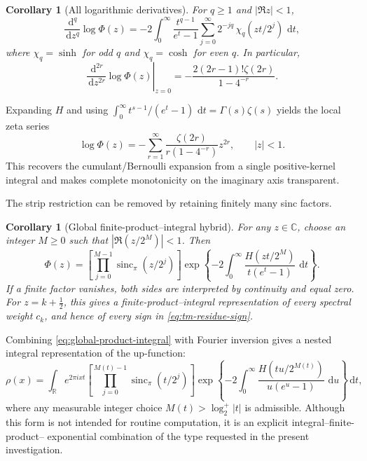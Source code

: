 \documentclass[11pt]{article}
\newtheorem{corollary}[theorem]{Corollary}
\theoremstyle{definition}
\theoremstyle{remark}
\newcommand{\C}{\mathbb C}
\newcommand{\dd}{\,\mathrm d}
\newcommand{\sincpi}{\operatorname{sinc}_{\pi}}
\begin{document}
\begin{corollary}[All logarithmic derivatives]
\label{cor:malmsten-derivatives}
For \(q\ge1\) and \(|\Re z|<1\),
\begin{equation}
 \frac{\dd^q}{\dd z^q}\log\Phi(z)
 =-2\int_0^\infty\frac{t^{q-1}}{e^t-1}
   \sum_{j=0}^{\infty}2^{-jq}\,\chi_q(zt/2^j)\,\dd t,      \label{eq:logPhi-deriv-integral}
\end{equation}
where \(\chi_q=\sinh\) for odd \(q\) and \(\chi_q=\cosh\) for even \(q\).
In particular,
\begin{equation}
 \left.\frac{\dd^{2r}}{\dd z^{2r}}\log\Phi(z)\right|_{z=0}
 =-\frac{2(2r-1)!\zeta(2r)}{1-4^{-r}}.                    \label{eq:logPhi-even-jet}
\end{equation}
\end{corollary}

Expanding \(H\) and using
\(\int_0^\infty t^{s-1}/(e^t-1)\,\dd t=\Gamma(s)\zeta(s)\)
yields the local zeta series
\begin{equation}
 \log\Phi(z)
 =-\sum_{r=1}^{\infty}
   \frac{\zeta(2r)}{r(1-4^{-r})}z^{2r},
 \qquad |z|<1.                                             \label{eq:logPhi-zeta-series}
\end{equation}
This recovers the cumulant/Bernoulli expansion from a single positive-kernel integral and
makes complete monotonicity on the imaginary axis transparent.

The strip restriction can be removed by retaining finitely many sinc factors.

\begin{corollary}[Global finite-product--integral hybrid]
\label{cor:global-hybrid}
For any \(z\in\C\), choose an integer \(M\ge0\) such that
\(|\Re(z/2^M)|<1\).  Then
\begin{equation}
\boxed{
 \Phi(z)=
 \left[\prod_{j=0}^{M-1}\sincpi(z/2^j)\right]
 \exp\!\left\{-2\int_0^\infty
 \frac{H(zt/2^M)}{t(e^t-1)}\,\dd t\right\}.}             \label{eq:global-product-integral}
\end{equation}
If a finite factor vanishes, both sides are interpreted by continuity and equal zero.
For \(z=k+\tfrac12\), this gives a finite-product--integral representation of every
spectral weight \(c_k\), and hence of every sign in \eqref{eq:tm-residue-sign}.
\end{corollary}

Combining \eqref{eq:global-product-integral} with Fourier inversion gives a nested
integral representation of the up-function:
\begin{equation}
 \rho(x)=\int_{\mathbb R}e^{2\pi ixt}
 \left[\prod_{j=0}^{M(t)-1}\sincpi(t/2^j)\right]
 \exp\!\left\{-2\int_0^\infty
 \frac{H(tu/2^{M(t)})}{u(e^u-1)}\,\dd u\right\}\dd t,     \label{eq:rho-nested-malmsten}
\end{equation}
where any measurable integer choice \(M(t)>\log_2^+|t|\) is admissible.  Although this
form is not intended for routine computation, it is an explicit integral--finite-product--
exponential combination of the type requested in the present investigation.
\end{document}
